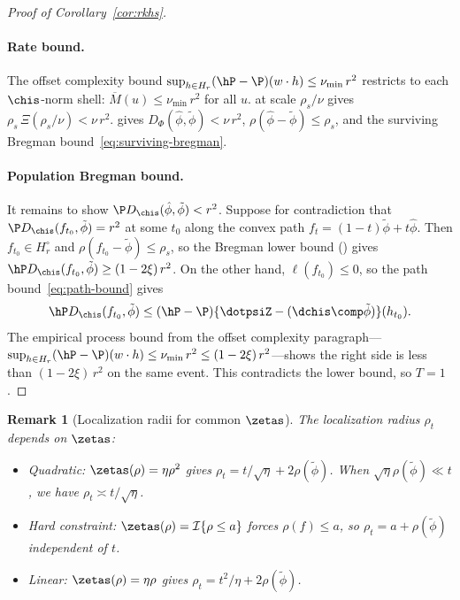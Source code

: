 \documentclass{article}
\newtheorem{remark}{Remark}[section]
\begin{document}
\begin{proof}[Proof of Corollary~\ref{cor:rkhs}]
\paragraph{Rate bound.}
The offset complexity bound
$\sup_{h \in H_r}
  (\hP - \P)(w \cdot h)
  \le \nu_{\min}\, r^2$
restricts to each $\chis$-norm shell:
$\overline{M}(u) \le \nu_{\min}\, r^2$
for all $u$.
at scale $\rho_s/\nu$
gives $\rho_s\, \Xi(\rho_s/\nu) < \nu\, r^2$.
 gives
$D_\Phi(\hat\phi,\tilde\phi) < \nu\, r^2$,
$\rho(\hat\phi-\tilde\phi) \le \rho_s$,
and the surviving Bregman
bound~\eqref{eq:surviving-bregman}.

\paragraph{Population Bregman bound.}
It remains to show
$\P D_{\chis}(\hat\phi,\tilde\phi) < r^2$.
Suppose for contradiction
that $\P D_{\chis}(f_{t_0}, \tilde\phi) = r^2$
at some $t_0$ along the convex path
$f_t = (1-t)\tilde\phi + t\hat\phi$.
Then $f_{t_0} \in H_r^\circ$
and $\rho(f_{t_0} - \tilde\phi) \le \rho_s$,
so the Bregman lower bound
() gives
$\hP D_{\chis}(f_{t_0},\tilde\phi)
  \ge (1-2\xi)\, r^2$.
On the other hand,
$\ell(f_{t_0}) \le 0$,
so the path bound~\eqref{eq:path-bound} gives
\[
\hP D_{\chis}(f_{t_0},\tilde\phi)
  \le (\hP - \P)\{\dotpsiZ
    - (\dchis \comp \tilde\phi)\}(h_{t_0}).
\]
The empirical process bound
from the offset complexity paragraph---$\sup_{h \in H_r}
  (\hP - \P)(w \cdot h)
  \le \nu_{\min}\, r^2
  \le (1-2\xi)\, r^2$---shows
the right side is less than
$(1-2\xi)\, r^2$
on the same event.
This contradicts the lower bound,
so $T = 1$.
\end{proof}

\begin{remark}[Localization radii for common $\zetas$]
\label{rmk:localization}
The localization radius $\rho_t$ depends on $\zetas$:
\begin{itemize}
\item \emph{Quadratic}: $\zetas(\rho) = \eta\rho^2$ gives $\rho_t = t/\sqrt{\eta} + 2\rho(\tilde\phi)$. When $\sqrt{\eta}\rho(\tilde\phi) \ll t$, we have $\rho_t \asymp t/\sqrt{\eta}$.
\item \emph{Hard constraint}: $\zetas(\rho) = \mathcal{I}\{\rho \le a\}$ forces $\rho(f) \le a$, so $\rho_t = a + \rho(\tilde\phi)$ independent of $t$.
\item \emph{Linear}: $\zetas(\rho) = \eta\rho$ gives $\rho_t = t^2/\eta + 2\rho(\tilde\phi)$.
\end{itemize}
\end{remark}
\end{document}
